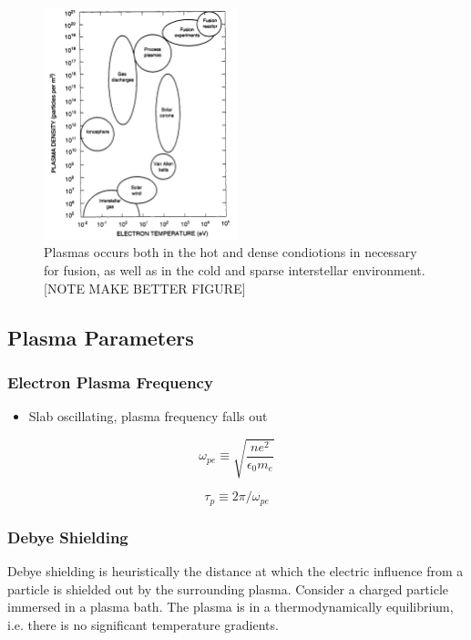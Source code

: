	\begin{figure}
		\begin{center}
			\includegraphics[width = 0.5\textwidth]{figures/theory/plasma_density}
		\end{center}
		\caption{Plasmas occurs both in the hot and dense condiotions in necessary for fusion, as
		well as in the cold and sparse interstellar environment. [NOTE MAKE BETTER FIGURE]
		}
	\end{figure}



    \subsection{Plasma Parameters}
		\label{sec:parameters}

		\subsubsection{Electron Plasma Frequency}

		\begin{itemize}
			\item Slab oscillating, plasma frequency falls out
		\end{itemize}

		\begin{equation}
			\omega_{pe} \equiv \sqrt{\frac{ne^2}{\epsilon_0 m_e}}
		\end{equation}

		\begin{equation}
			\tau_p \equiv 2\pi/\omega_{pe}
		\end{equation}

		\subsubsection{Debye Shielding}
		Debye shielding is heuristically the distance at which the electric influence
		from a particle is shielded out by the surrounding plasma.
		Consider a charged particle immersed in a plasma bath. The plasma is in
		a thermodynamically equilibrium, i.e. there is no significant temperature
		gradients.



